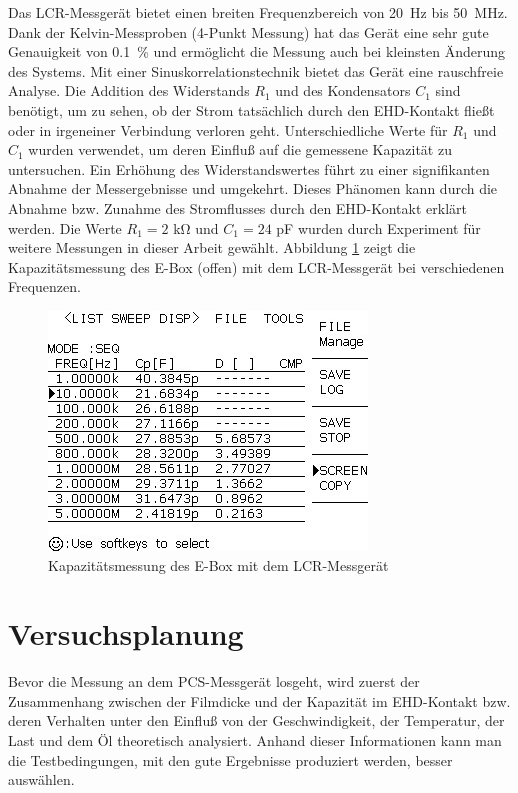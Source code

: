 Das LCR-Messgerät bietet einen breiten Frequenzbereich von \SI{20}{\Hz} bis \SI{50}{\MHz}.
Dank der Kelvin-Messproben (4-Punkt Messung) hat das Gerät eine sehr gute Genauigkeit von \SI{0.1}{\percent} und ermöglicht die Messung auch bei kleinsten Änderung des Systems.
Mit einer Sinuskorrelationstechnik bietet das Gerät eine rauschfreie Analyse.
Die Addition des Widerstands $R_1$ und des Kondensators $C_1$ sind benötigt, um zu sehen, ob der Strom tatsächlich durch den EHD-Kontakt fließt oder in irgeneiner Verbindung verloren geht.
Unterschiedliche Werte für $R_1$ und $C_1$ wurden verwendet, um deren Einfluß auf die gemessene Kapazität zu untersuchen.
Ein Erhöhung des Widerstandswertes führt zu einer signifikanten Abnahme der Messergebnisse und umgekehrt.
Dieses Phänomen kann durch die Abnahme bzw. Zunahme des Stromflusses durch den EHD-Kontakt erklärt werden.
Die Werte $R_1 = 2$ \si{\kilo\ohm} und $C_1 = 24$ \si{\pico\farad} wurden durch Experiment für weitere Messungen in dieser Arbeit gewählt.
Abbildung \ref{fig:lcr_ebox_capacitance} zeigt die Kapazitätsmessung des E-Box (offen) mit dem LCR-Messgerät bei verschiedenen Frequenzen.
\begin{figure}[htb]
    \centering
    \includegraphics[width=0.5\linewidth]{./images/lcr_ebox_capacitance.jpg}
    \caption{Kapazitätsmessung des E-Box mit dem LCR-Messgerät}
    \label{fig:lcr_ebox_capacitance}
\end{figure}

\section{Versuchsplanung}
\label{sec:versuchsplanung}

Bevor die Messung an dem PCS-Messgerät losgeht, wird zuerst der Zusammenhang zwischen der Filmdicke und der Kapazität im EHD-Kontakt bzw. deren Verhalten unter den Einfluß von der Geschwindigkeit, der Temperatur, der Last und dem Öl theoretisch analysiert.
Anhand dieser Informationen kann man die Testbedingungen, mit den gute Ergebnisse produziert werden, besser auswählen.

